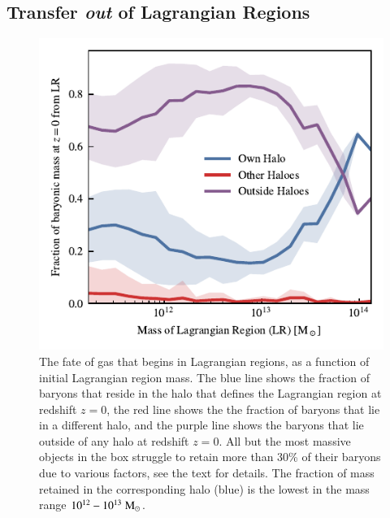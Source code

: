 \subsection{Transfer \emph{out} of Lagrangian Regions}

\begin{figure}
	\centering
	\includegraphics{figures/s50j7kAHF/inverse_component_fraction.pdf}
	\vspace{-0.7cm}
 \caption{The fate of gas that begins in Lagrangian regions, as a function of
 initial Lagrangian region mass. The blue line shows the fraction of baryons
 that reside in the halo that defines the Lagrangian region at redshift
 $z=0$, the red line shows the the fraction of baryons that lie in a
 different halo, and the purple line shows the baryons that lie outside of
 any halo at redshift $z=0$. All but the most massive objects in the box
 struggle to retain more than 30\% of their baryons due to various factors,
 see the text for details. The fraction of mass retained in the corresponding
 halo (blue) is the lowest in the mass range $10^{12} - 10^{13}\;{\rm M}_{\odot}{}$.}

	\label{fig:transferoutoflrs}
\end{figure}



